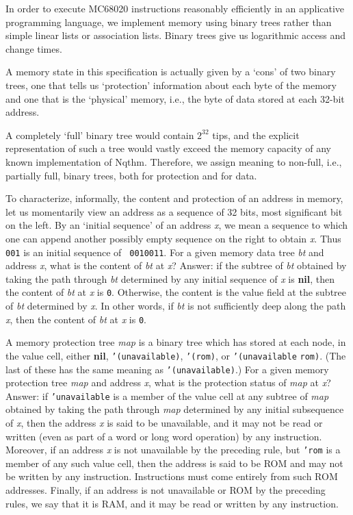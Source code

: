  In order to execute MC68020 instructions reasonably efficiently in an
 applicative programming language, we implement memory using binary trees
 rather than simple linear lists or association lists.  Binary trees give us
 logarithmic access and change times.

 A memory state in this specification is actually given by a `cons' of two
 binary trees, one that tells us `protection' information about each byte of
 the memory and one that is the `physical' memory, i.e., the byte of data
 stored at each 32-bit address.

 A completely `full' binary tree would contain $2^{32}$ tips, and the explicit
 representation of such a tree would vastly exceed the memory capacity of any
 known implementation of Nqthm.  Therefore, we assign meaning to non-full,
 i.e., partially full, binary trees, both for protection and for data.

 To characterize, informally, the content and protection of an address in
 memory, let us momentarily view an address as a sequence of 32 bits, most
 significant bit on the left.  By an `initial sequence' of an address {\it{x\/}}, we mean a
 sequence to which one can append another possibly empty sequence on the
 right to obtain {\it{x\/}}.  Thus {\tt 001} is an initial sequence of {\tt
 0010011}.  For a given memory data tree {\it{bt\/}} and address {\it{x\/}}, what is the
 content of {\it{bt\/}} at {\it{x\/}}?  Answer: if the subtree of {\it{bt\/}} obtained by taking
 the path through {\it{bt\/}} determined by any initial sequence of {\it{x\/}} is {\bf{nil}},
 then the content of {\it{bt\/}} at {\it{x\/}} is {\tt 0}.  Otherwise, the content is the
 value field at the subtree of {\it{bt\/}} determined by {\it{x\/}}.  In other words, if
 {\it{bt\/}} is not sufficiently deep along the path {\it{x\/}}, then the content of
 {\it{bt\/}} at {\it{x\/}} is {\tt 0}.

 A memory protection tree {\it{map\/}} is a binary tree which has stored at each
 node, in the value cell, either {\bf{nil}}, {\tt{'}}{\tt{(}}{\tt{unavailable}}{\tt{)}}, {\tt{'}}{\tt{(}}{\tt{rom}}{\tt{)}}, or
 {\tt{'}}{\tt{(}}{\tt{unavailable}} {\tt{rom}}{\tt{)}}.  (The last of these has the same meaning as
 {\tt{'}}{\tt{(}}{\tt{unavailable}}{\tt{)}}.) For a given memory protection tree {\it{map\/}} and address {\it{x\/}},
 what is the protection status of {\it{map\/}} at {\it{x\/}}?  Answer: if {\tt{'}}{\tt{unavailable}} is
 a member of the value cell at any subtree of {\it{map\/}} obtained by taking the
 path through {\it{map\/}} determined by any initial subsequence of {\it{x\/}}, then the
 address {\it{x\/}} is said to be unavailable, and it may not be read or written
 (even as part of a word or long word operation) by any instruction.
 Moreover, if an address {\it{x\/}} is not unavailable by the preceding rule, but
 {\tt{'}}{\tt{rom}} is a member of any such value cell, then the address is said to be
 ROM and may not be written by any instruction.  Instructions must come
 entirely from such ROM addresses.  Finally, if an address is not unavailable
 or ROM by the preceding rules, we say that it is RAM, and it may be read or
 written by any instruction.  

